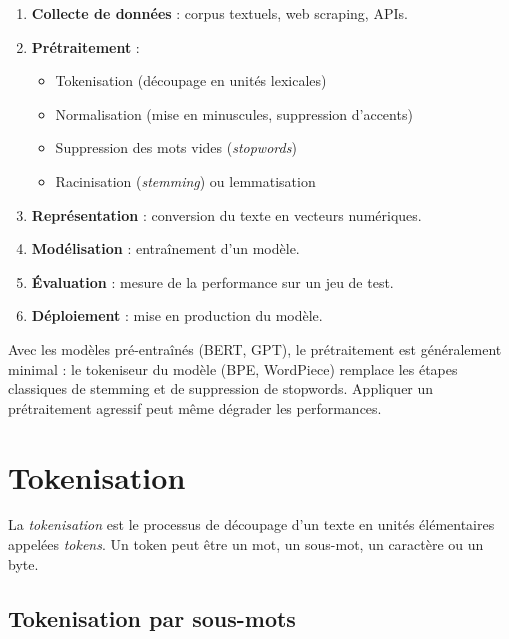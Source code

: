 \begin{enumerate}
    \item \textbf{Collecte de donn\'ees} : corpus textuels, web scraping, APIs.
    \item \textbf{Pr\'etraitement} :
    \begin{itemize}
        \item Tokenisation (d\'ecoupage en unit\'es lexicales)
        \item Normalisation (mise en minuscules, suppression d'accents)
        \item Suppression des mots vides (\emph{stopwords})
        \item Racinisation (\emph{stemming}) ou lemmatisation
    \end{itemize}
    \item \textbf{Repr\'esentation} : conversion du texte en vecteurs num\'eriques.
    \item \textbf{Mod\'elisation} : entra\^inement d'un mod\`ele.
    \item \textbf{\'Evaluation} : mesure de la performance sur un jeu de test.
    \item \textbf{D\'eploiement} : mise en production du mod\`ele.
\end{enumerate}

\begin{attention}[title=\textbf{Pr\'etraitement et mod\`eles modernes}]
Avec les mod\`eles pr\'e-entra\^in\'es (BERT, GPT), le pr\'etraitement est
g\'en\'eralement minimal : le tokeniseur du mod\`ele (BPE, WordPiece) remplace
les \'etapes classiques de stemming et de suppression de stopwords. Appliquer
un pr\'etraitement agressif peut m\^eme d\'egrader les performances.
\end{attention}

\section{Tokenisation}
\label{sec:intro:tokenisation}

\begin{definition}[Tokenisation]
La \emph{tokenisation} est le processus de d\'ecoupage d'un texte en unit\'es
\'el\'ementaires appel\'ees \emph{tokens}. Un token peut \^etre un mot, un
sous-mot, un caract\`ere ou un byte.
\end{definition}

\subsection{Tokenisation par sous-mots}

